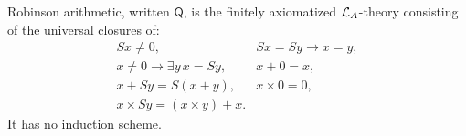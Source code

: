 \begin{definition}
Robinson arithmetic, written \(\mathsf Q\), is the finitely axiomatized
\(\mathcal{L}_A\)-theory consisting of the universal closures of:
\[
\begin{array}{ll}
  Sx\neq0, & Sx=Sy\to x=y,\\
  x\neq0\to\exists y\,x=Sy, & x+0=x,\\
  x+Sy=S(x+y), & x\times0=0,\\
  x\times Sy=(x\times y)+x. &
\end{array}
\]
It has no induction scheme.
\end{definition}
